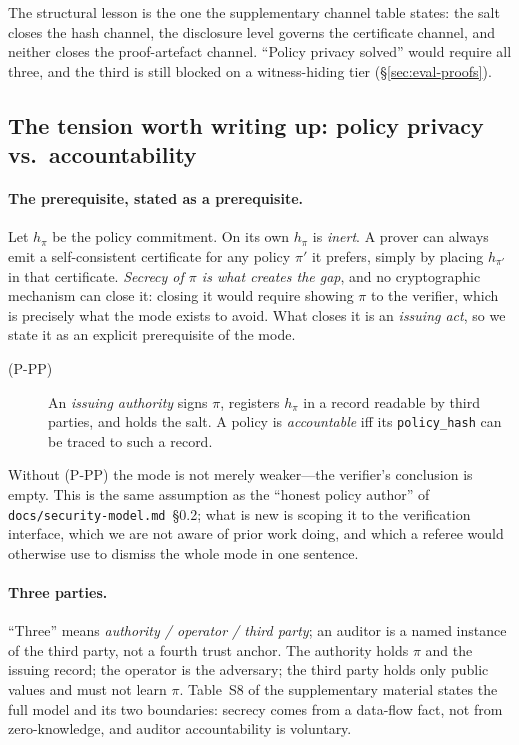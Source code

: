 \documentclass[10pt,journal,compsoc]{IEEEtran}
\begin{document}
The structural lesson is the one the supplementary channel table states: the salt closes the
hash channel, the disclosure level governs the certificate channel, and neither
closes the proof-artefact channel. ``Policy privacy solved'' would require all
three, and the third is still blocked on a witness-hiding tier
(\S\ref{sec:eval-proofs}).

\subsection{The tension worth writing up: policy privacy vs.\ accountability}
\label{sec:wp4-tension}

\paragraph{The prerequisite, stated as a prerequisite.} Let $h_\pi$ be the
policy commitment. On its own $h_\pi$ is \emph{inert}. A prover can always
emit a self-consistent certificate for any policy $\pi'$ it prefers, simply by
placing $h_{\pi'}$ in that certificate. \emph{Secrecy of $\pi$ is what creates
the gap}, and no cryptographic mechanism can close it: closing it would require
showing $\pi$ to the verifier, which is precisely what the mode exists to avoid.
What closes it is an \emph{issuing act}, so we state it as an explicit
prerequisite of the mode.

\begin{description}
  \item[(P-PP)] An \emph{issuing authority} signs $\pi$, registers $h_\pi$ in a
  record readable by third parties, and holds the salt. A policy is
  \emph{accountable} iff its \texttt{policy\_hash} can be traced to such a
  record.
\end{description}

Without (P-PP) the mode is not merely weaker---the verifier's conclusion is
empty. This is the same assumption as the ``honest policy author'' of
\texttt{docs/security-model.md}~\S0.2; what is new is scoping it to the
verification interface, which we are not aware of prior work doing, and which a
referee would otherwise use to dismiss the whole mode in one sentence.

\paragraph{Three parties.} ``Three'' means \emph{authority / operator / third
party}; an auditor is a named instance of the third party, not a fourth trust
anchor. The authority holds $\pi$ and the issuing record; the operator is the
adversary; the third party holds only public values and must not learn $\pi$.
Table~S8 of the supplementary material states the full model and its two
boundaries: secrecy comes from a data-flow fact, not from zero-knowledge, and
auditor accountability is voluntary.
\end{document}
